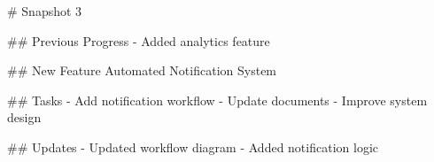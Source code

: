 
# Snapshot 3

## Previous Progress
- Added analytics feature

## New Feature
Automated Notification System

## Tasks
- Add notification workflow
- Update documents
- Improve system design

## Updates
- Updated workflow diagram
- Added notification logic
